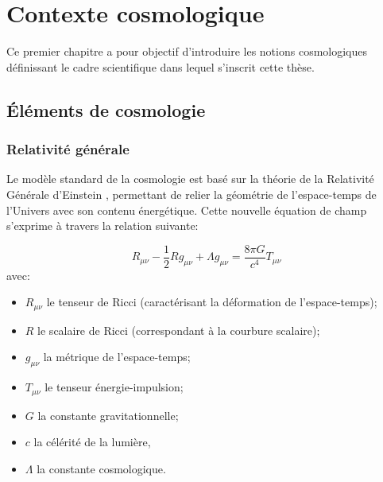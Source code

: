 \documentclass[../main/main.tex]{subfiles}
\begin{document}
\chapter{Contexte cosmologique}\label{cp:cosmo}

\minitoc
\vspace{2cm}
Ce premier chapitre a pour objectif d'introduire les notions
cosmologiques définissant le cadre scientifique dans lequel s'inscrit
cette thèse. 
\newpage
\section{\'Eléments de cosmologie}\label{sec:11}

\subsection{Relativité générale}

Le modèle standard de la cosmologie est basé sur la théorie de la
Relativité Générale d'Einstein
\citep{Einstein1915c,Einstein1915a,Einstein1915b}, permettant de relier la géométrie
de l'espace-temps de l'Univers avec son contenu énergétique. Cette
nouvelle équation de champ s'exprime à travers la relation suivante:

\begin{equation}
  \label{eq:generalrelativity}
  R_{\mu\nu}-\frac{1}{2}Rg_{\mu\nu}+\Lambda g_{\mu\nu}=\frac{8\pi G}{c^{4}}T_{\mu\nu}
\end{equation}
avec:
\begin{itemize}[noitemsep, label=$\diamondsuit$]
\item $R_{\mu\nu}$ le tenseur de Ricci (caractérisant la déformation
  de l'espace-temps);
\item $R$ le scalaire de Ricci (correspondant à la courbure
  scalaire);
\item $g_{\mu\nu}$ la métrique de l'espace-temps;
\item $T_{\mu\nu}$ le tenseur énergie-impulsion;
\item $G$ la constante gravitationnelle;
\item $c$ la célérité de la lumière,
\item $\Lambda$ la constante cosmologique.
\end{itemize}
\end{document}
